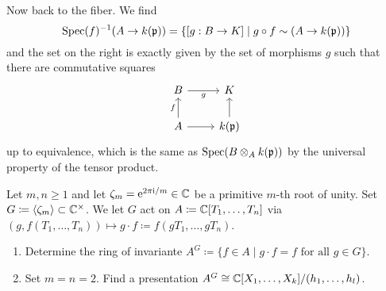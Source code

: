 \documentclass[a4paper,11pt]{article}
\begin{document}
\begin{enumerate}
        Now back to the fiber. We find 
        \begin{equation*}
            \operatorname{Spec}(f)^{-1}(A \to k(\mathfrak{p})) = \{[g: B \to K] \mid g \circ f \sim (A \to k(\mathfrak{p}))\}
        \end{equation*}
        and the set on the right is exactly given by the set of morphisms $g$ such that
        there are commutative squares
        \[
        \begin{tikzcd}[ampersand replacement=\&]
        	B \& K \\
        	A \& {k(\fp)}
        	\arrow["f", from=2-1, to=1-1]
        	\arrow[from=2-1, to=2-2]
        	\arrow["g"', from=1-1, to=1-2]
        	\arrow[from=2-2, to=1-2]
        \end{tikzcd}
        \]
        up to equivalence, which is the same as $\operatorname{Spec}(B \otimes_A k(\mathfrak{p}))$ by the 
        universal property of the tensor product.

\end{enumerate}


Let $m, n \geq 1$ and let $\zeta_m = \mathrm e^{2 \pi \mathrm i / m} \in \mathbb{C}$ be a primitive
$m$-th root of unity. Set $G \coloneqq \langle \zeta_m \rangle \subset \mathbb{C}^\times$. 
We let $G$ act on $A \coloneqq \mathbb{C}[T_1, \dots, T_n]$ via $(g, f(T_1, \dots, T_n))
\mapsto g \cdot f \coloneqq f(gT_1, \dots, gT_n)$. 
\begin{enumerate}
    \item Determine the ring of invariante $A^G \coloneqq \{f \in A \mid 
        g \cdot f = f \text{ for all } g \in G\}$.
    \item Set $m = n = 2$. Find a presentation $A^G \cong \mathbb{C}[X_1, \dots, X_k]
        /(h_1, \dots, h_l)$. 
\end{enumerate}
\end{document}
